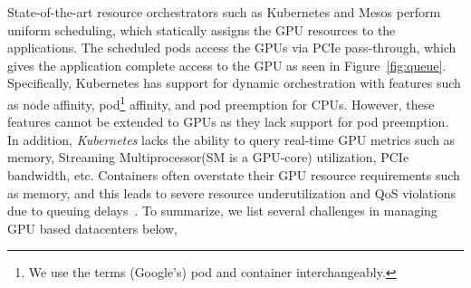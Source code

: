 State-of-the-art resource orchestrators such as Kubernetes \cite{kubernetes} and Mesos \cite{mesos} perform uniform scheduling, which statically assigns the GPU resources to the applications. The scheduled pods access the GPUs via PCIe pass-through, which gives the application complete access to the GPU as seen in Figure~\ref{fig:queue}. Specifically, Kubernetes has support for dynamic orchestration with features such as node affinity, pod\footnote{We use the terms (Google's) pod and container interchangeably.} affinity, and pod preemption for CPUs. However, these features cannot be extended to GPUs as they lack support for pod preemption. In addition, \textit{Kubernetes} lacks the ability to query real-time GPU metrics such as memory, Streaming Multiprocessor(SM is a GPU-core) utilization, PCIe bandwidth, etc. Containers often overstate their GPU resource requirements such as memory, and this leads to severe resource underutilization and QoS violations due to queuing delays~\cite{kang2017convgpu}. To summarize, we list several challenges in managing GPU based datacenters below, %





